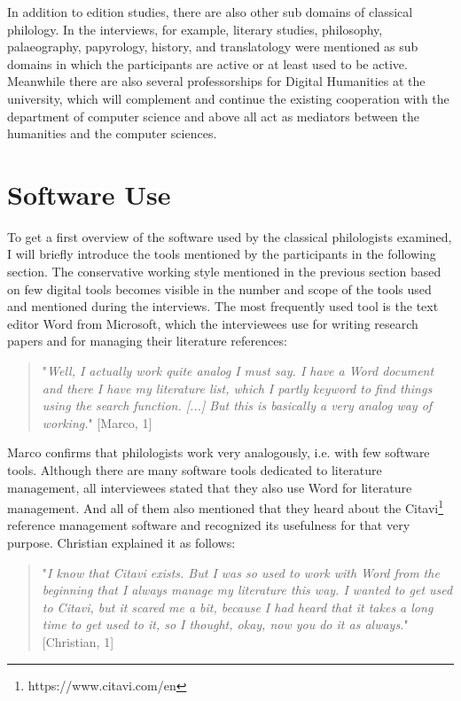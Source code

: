 \documentclass[12pt, a4paper, titlepage, oneside, abstract=true, toc=listof, toc=bibliography]{scrreprt}
\begin{document}
In addition to edition studies, there are also other sub domains of classical philology. In the interviews, for example, literary studies, philosophy, palaeography, papyrology, history, and translatology were mentioned as sub domains in which the participants are active or at least used to be active. Meanwhile there are also several professorships for Digital Humanities at the university, which will complement and continue the existing cooperation with the department of computer science and above all act as mediators between the humanities and the computer sciences. 

\section{Software Use}
\label{SW_use}
To get a first overview of the software used by the classical philologists examined, I will briefly introduce the tools mentioned by the participants in the following section.
The conservative working style mentioned in the previous section based on few digital tools becomes visible in the number and scope of the tools used and mentioned during the interviews. The most frequently used tool is the text editor \gls{Word} from Microsoft, which the interviewees use for writing research papers and for managing their literature references:

\begin{quotation}
"\textit{Well, I actually work quite analog I must say. I have a Word document and there I have my literature list, which I partly keyword to find things using the search function. [...] But this is basically a very analog way of working.}" [Marco, 1]
\end{quotation}

Marco confirms that philologists work very analogously, i.e. with few software tools. Although there are many software tools dedicated to literature management, all interviewees stated that they also use Word for literature management. And all of them also mentioned that they heard about the \gls{Citavi}\footnote{https://www.citavi.com/en} reference management software and recognized its usefulness for that very purpose. Christian explained it as follows:

\begin{quotation}
"\textit{I know that Citavi exists. But I was so used to work with Word from the beginning that I always manage my literature this way. I wanted to get used to Citavi, but it scared me a bit, because I had heard that it takes a long time to get used to it, so I thought, okay, now you do it as always.}" [Christian, 1]
\end{quotation}
 
\end{document}
